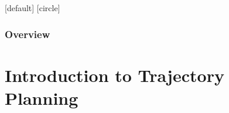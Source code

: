 \documentclass[10pt, aspectratio=169]{beamer}
\theoremstyle{remark}
\theoremstyle{definition}
\begin{document}
[default]
[circle]

\begin{frame}
	\frametitle{Overview} %
	\tableofcontents %
\end{frame}



\section{Introduction to Trajectory Planning}
\end{document}
